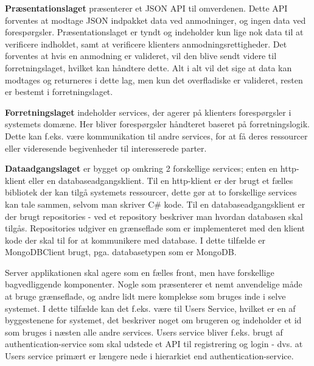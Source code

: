 \textbf{Præsentationslaget} præsenterer et JSON \cite[JSON]{converge-terms} API til omverdenen. Dette API \cite[API]{converge-terms} forventes at modtage JSON indpakket data ved anmodninger, og ingen data ved forespørgsler. Præsentationslaget er tyndt og indeholder kun lige nok data til at verificere indholdet, samt at verificere klienters anmodningsrettigheder. Det forventes at hvis en anmodning er valideret, vil den blive sendt videre til forretningslaget, hvilket kan håndtere dette. Alt i alt vil det sige at data kan modtages og returneres i dette lag, men kun det overfladiske er valideret, resten er bestemt i forretningslaget.

\textbf{Forretningslaget} indeholder services, der agerer på klienters forespørgsler i systemets domæne. Her bliver forespørgsler håndteret baseret på forretningslogik. Dette kan f.eks. være kommunikation til andre services, for at få deres ressourcer eller videresende begivenheder til interesserede parter.

\textbf{Dataadgangslaget} er bygget op omkring 2 forskellige services; enten en http-klient eller en databaseadgangsklient. Til en http-klient er der brugt et fælles bibliotek der kan tilgå systemets ressourcer, dette gør at to forskellige services kan tale sammen, selvom man skriver C\# kode. Til en databaseadgangsklient er der brugt repositories - ved et repository beskriver man hvordan databasen skal tilgås. Repositories udgiver en grænseflade som er implementeret med den klient kode der skal til for at kommunikere med database. I dette tilfælde er MongoDBClient brugt, pga. databasetypen som er MongoDB.

Server applikationen skal agere som en fælles front, men have forskellige  bagvedliggende komponenter. Nogle som præsenterer et nemt anvendelige måde at bruge grænseflade, og andre lidt mere komplekse som bruges inde i selve systemet. I dette tilfælde kan det f.eks. være til Users Service, hvilket er en af byggestenene for systemet, det beskriver noget om brugeren og indeholder et id som bruges i næsten alle andre services. Users service bliver f.eks. brugt af authentication-service som skal udstede et API til registrering og login - dvs. at Users service primært er længere nede i hierarkiet end authentication-service.